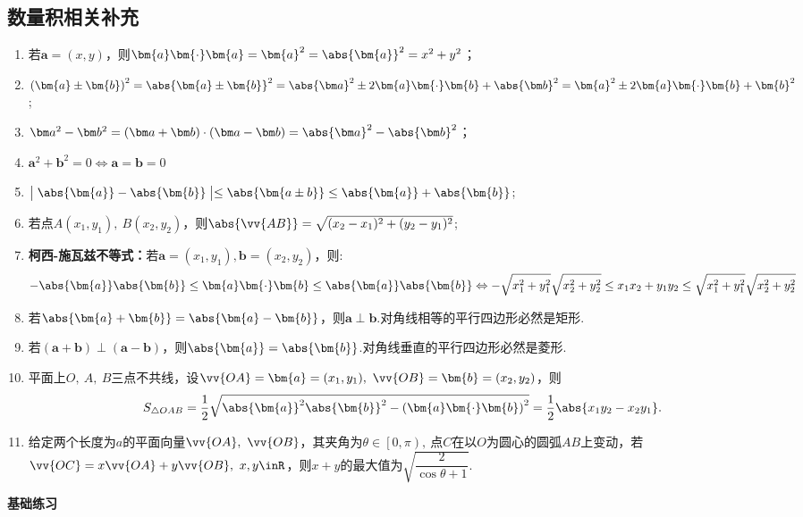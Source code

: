 \begin{Theorem}[平面向量基本定理]
  \subsection{数量积相关补充}
    \begin{enumerate}[label=\circled{\arabic*}]
      \item 若$\bm{a}=\left(x,y\right)$，则$ \bm{a}\bm{\cdot}\bm{a}=\bm{a}^2=\abs{\bm{a}}^2=x^2+y^2 $；
      \item $ \left(\bm{a}\pm \bm{b}\right)^2=\abs{\bm{a}\pm \bm{b}}^2=\abs{\bm a}^2\pm2\bm{a}\bm{\cdot}\bm{b}+\abs{\bm b}^2=\bm{a}^2\pm2\bm{a}\bm{\cdot}\bm{b}+\bm{b}^2$;
      \item $\bm a^2-\bm b^2=(\bm a+\bm b)\cdot(\bm a-\bm b)=\abs{\bm a}^2-\abs{\bm b}^2$；
      \item $\bm a^2+\bm b^2=0\Leftrightarrow \bm a=\bm b=0$
      \item $\bigm|\abs{\bm{a}}-\abs{\bm{b}}\bigm|\le\abs{\bm{a\pm b}}\le\abs{\bm{a}}+\abs{\bm{b}}$;
      \item 若点$ A(x_1,y_1),~B(x_2,y_2) $，则$ \abs{\vv{AB}}=\sqrt{(x_2-x_1)^2+(y_2-y_1)^2} $;
      \item \textbf{柯西-施瓦兹不等式：}若$\bm{a}=\left(x_1,y_1\right),\bm{b}=\left(x_2,y_2\right)$，则:$$ -\abs{\bm{a}}\abs{\bm{b}}\le\bm{a}\bm{\cdot}\bm{b}\le\abs{\bm{a}}\abs{\bm{b}}\Leftrightarrow -\sqrt{x_1^2+y_1^2}\sqrt{x_2^2+y_2^2}\le x_1x_2+y_1y_2\le \sqrt{x_1^2+y_1^2}\sqrt{x_2^2+y_2^2}$$
      \item 若$ \abs{\bm{a}+\bm{b}}=\abs{\bm{a}-\bm{b}} $，则$ \bm{a}\perp\bm{b} $.对角线相等的平行四边形必然是矩形.
      \item 若$ \left(\bm{a}+\bm{b}\right)\perp\left(\bm{a}-\bm{b}\right) $，则$\abs{\bm{a}}=\abs{\bm{b}} $.对角线垂直的平行四边形必然是菱形.
      \item 平面上$ O,~A,~B $三点不共线，设$\vv{OA}=\bm{a}=(x_1,y_1) ,~\vv{OB}=\bm{b}=(x_2,y_2)$，则$$ S_{\triangle OAB}=\dfrac{1}{2}\sqrt{\abs{\bm{a}}^2\abs{\bm{b}}^2-\left(\bm{a}\bm{\cdot}\bm{b}\right)^2}=\dfrac{1}{2}\abs{x_1y_2-x_2y_1} .$$
      \item 给定两个长度为$ a $的平面向量$ \vv{OA},~\vv{OB} $，其夹角为$ \theta\in\left[0,\pi \right), ~$点$ C $在以$ O $为圆心的圆弧$ AB $上变动，若$ \vv{OC}=x\vv{OA}+y\vv{OB},~x,y\inR $，则$ x+y $的最大值为$ \sqrt{\dfrac{2}{\cos\theta+1}}. $
    \end{enumerate}
  \begin{exercise}{{\textbf{基础练习}}}
    \item%

\end{exercise}
\end{Theorem}
